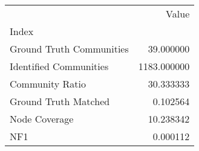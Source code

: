 \begin{tabular}{lr}
\toprule
{} &        Value \\
Index                    &              \\
\midrule
Ground Truth Communities &    39.000000 \\
Identified Communities   &  1183.000000 \\
Community Ratio          &    30.333333 \\
Ground Truth Matched     &     0.102564 \\
Node Coverage            &    10.238342 \\
NF1                      &     0.000112 \\
\bottomrule
\end{tabular}
